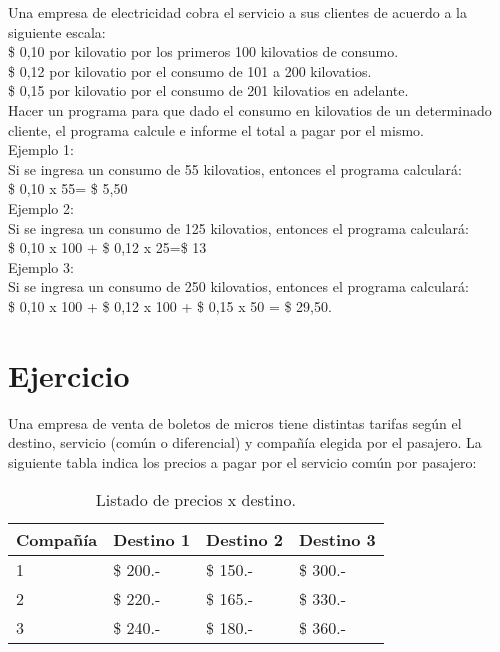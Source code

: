 \documentclass[12pt,a4paper,twoside]{article}
\begin{document}
\hspace*{1cm}Una empresa de electricidad cobra el servicio a sus clientes de acuerdo a la siguiente escala:\\
\$ 0,10 por kilovatio por los primeros 100 kilovatios de consumo.\\
\$ 0,12 por kilovatio por el consumo de 101 a 200 kilovatios.\\
\$ 0,15 por kilovatio por el consumo de 201 kilovatios en adelante.\\
Hacer un programa para que dado el consumo en kilovatios de un determinado cliente, el programa calcule e informe el total a pagar por el mismo.\\
Ejemplo 1:\\
Si se ingresa un consumo de 55 kilovatios, entonces el programa calculará:\\
\$ 0,10 x 55= \$ 5,50\\
Ejemplo 2:\\
Si se ingresa un consumo de 125 kilovatios, entonces el programa calculará:\\
\$ 0,10 x 100 + \$ 0,12 x 25=\$ 13\\
Ejemplo 3:\\ Si se ingresa un consumo de 250 kilovatios, entonces el programa calculará:\\
\$ 0,10 x 100 + \$ 0,12 x 100 + \$ 0,15 x 50 = \$ 29,50.\\

\newpage{\ }
\newpage{\ }

\section{Ejercicio }

\hspace*{1cm}Una empresa de venta de boletos de micros tiene distintas tarifas según el destino, servicio (común o diferencial) y compañía elegida por el pasajero. La siguiente tabla indica los precios a pagar por el servicio común por pasajero:

\begin{table}[htbp]
\begin{center}
\begin{tabular}{|l|l|l|l|}
\hline
Compañía &  Destino 1 &  Destino 2 & Destino 3 \\
\hline \hline
1 & \$ 200.- & \$ 150.- & \$ 300.- \\ \hline
2 & \$ 220.- & \$ 165.- & \$ 330.- \\ \hline
3 & \$ 240.- & \$ 180.- & \$ 360.- \\ \hline
\end{tabular}
\caption{Listado de precios x destino.}
\label{tabla:sencilla}
\end{center}
\end{table}
\end{document}
